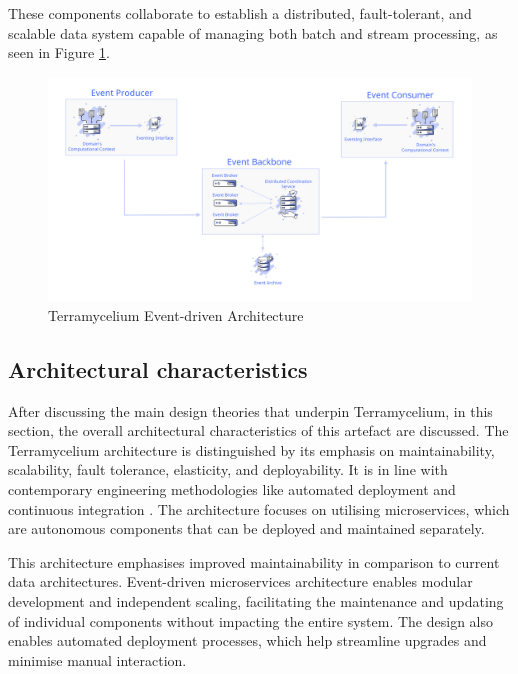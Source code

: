 \documentclass[preprint,12pt]{elsarticle}
\begin{document}
These components collaborate to establish a distributed, fault-tolerant, and scalable data system capable of managing both batch and stream processing, as seen in Figure \ref{fig:eventDrivenArchitecture}. 

\begin{figure}[ht]

  \centering

  \includegraphics[width=13cm]{images/Event-architecture.png}

  \caption{Terramycelium Event-driven Architecture}

  \label{fig:eventDrivenArchitecture}

\end{figure}

\subsection{Architectural characteristics}

After discussing the main design theories that underpin Terramycelium, in this section, the overall architectural characteristics of this artefact are discussed. The Terramycelium architecture is distinguished by its emphasis on maintainability, scalability, fault tolerance, elasticity, and deployability. It is in line with contemporary engineering methodologies like automated deployment and continuous integration \cite{Ford2021SoftwareArchitecture}. The architecture focuses on utilising microservices, which are autonomous components that can be deployed and maintained separately.

This architecture emphasises improved maintainability in comparison to current data architectures. Event-driven microservices architecture enables modular development and independent scaling, facilitating the maintenance and updating of individual components without impacting the entire system. The design also enables automated deployment processes, which help streamline upgrades and minimise manual interaction.
\end{document}
